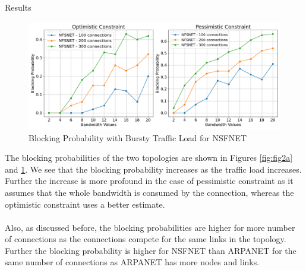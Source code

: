\begin{section}{Results}
\begin{figure}[H]
    \centering
    \includegraphics[width=\textwidth]{figures/fig2/fig2b.png}
    \caption{Blocking Probability with Bursty Traffic Load for NSFNET}
    \label{fig:fig2b}
\end{figure}

The blocking probabilities of the two topologies are shown in Figures \ref{fig:fig2a} and \ref{fig:fig2b}. We see that the blocking probability increases as the traffic load increases. Further the increase is more profound in the case of pessimistic constraint as it assumes that the whole bandwidth is consumed by the connection, whereas the optimistic constraint uses a better estimate. \\ \\
Also, as discussed before, the blocking probabilities are higher for more number of connections as the connections compete for the same links in the topology. Further the blocking probability is higher for NSFNET than ARPANET for the same number of connections as ARPANET has more nodes and links. \\ 

\end{section}
